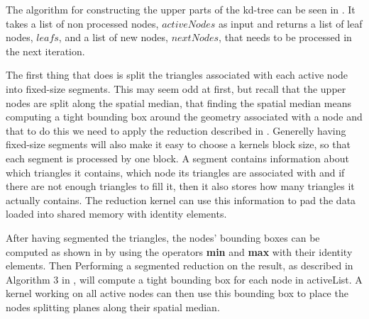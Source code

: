 \begin{algorithm}
\begin{algorithmic}
{                 \STATE{}

                   \ELSE
                   \ENDIF
                 \ENDFOR
  }
  \end{algorithmic}
\end{algorithm}


The algorithm for constructing the upper parts of the kd-tree can be
seen in . It takes a list of non
processed nodes, $activeNodes$ as input and returns a list of leaf
nodes, $leafs$, and a list of new nodes, $nextNodes$, that needs to be
processed in the next iteration.



The first thing that  does is split the triangles
associated with each active node into fixed-size segments. This may seem odd at
first, but recall that the upper nodes are split along the spatial median, that
finding the spatial median means computing a tight bounding box around the
geometry associated with a node and that to do this we need to apply the
reduction described in . Generelly having fixed-size
segments will also make it easy to choose a kernels block size, so that each
segment is processed by one block. A segment contains information about which
triangles it contains, which node its triangles are associated with and if there
are not enough triangles to fill it, then it also stores how many triangles it
actually contains. The reduction kernel can use this information to pad the data
loaded into shared memory with identity elements.

After having segmented the triangles, the nodes' bounding boxes can be computed
as shown in  by using the operators \textbf{min} and
\textbf{max} with their identity elements. Then Performing a segmented reduction
on the result, as described in Algorithm 3 in \zhou, will compute a tight
bounding box for each node in activeList. A kernel working on all active nodes
can then use this bounding box to place the nodes splitting planes along their
spatial median.

